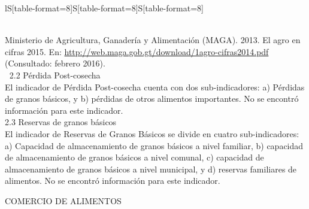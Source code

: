 {\begin{center}
\begin{tabular}{lS[table-format=8]S[table-format=8]S[table-format=8]}
				\\
				\\	
			\end{tabular}\addtocounter{Cuadro}{1}
		\end{center}
		{\footnotesize	Ministerio de Agricultura, Ganadería y Alimentación (MAGA). 2013. El agro en cifras 2015. En: \url{http://web.maga.gob.gt/download/1agro-cifras2014.pdf}  (Consultado: febrero 2016).}\\[1cm]
		\normalsize
		$\ $
			{\Bold\Large 2.2 Pérdida Post-cosecha}\\[-.5cm]
			
			El indicador de Pérdida Post-cosecha cuenta con dos sub-indicadores: a) Pérdidas de granos básicos, y b) pérdidas de otros alimentos importantes. No se encontró información para este indicador.\\
			
				{\Bold\Large 	2.3	Reservas de granos básicos}\\[-.5cm]
				
				El indicador de Reservas de Granos Básicos se divide en cuatro sub-indicadores: a) Capacidad de almacenamiento de granos básicos a nivel familiar, b) capacidad de almacenamiento de granos básicos a nivel comunal, c) capacidad de almacenamiento de granos básicos a nivel municipal, y d) reservas familiares de alimentos. No se encontró información para este indicador. \\
				
				}
		
\newpage
		$\ $\\[-1cm]
		
		{\Bold\Large  COMERCIO DE ALIMENTOS}\\[-.5cm]
		
